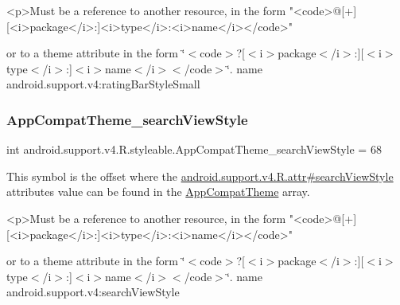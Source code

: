 \begin{DoxyVerb}      <p>Must be a reference to another resource, in the form "<code>@[+][<i>package</i>:]<i>type</i>:<i>name</i></code>"
\end{DoxyVerb}
 or to a theme attribute in the form \char`\"{}$<$code$>$?\mbox{[}$<$i$>$package$<$/i$>$\+:\mbox{]}\mbox{[}$<$i$>$type$<$/i$>$\+:\mbox{]}$<$i$>$name$<$/i$>$$<$/code$>$\char`\"{}.  name android.\+support.\+v4\+:rating\+Bar\+Style\+Small \mbox{\label{classandroid_1_1support_1_1v4_1_1R_1_1styleable_ad107185a80adbb1be528d21aa3a5e644}} 
\subsubsection{\texorpdfstring{App\+Compat\+Theme\+\_\+search\+View\+Style}{AppCompatTheme\_searchViewStyle}}
{\footnotesize\ttfamily int android.\+support.\+v4.\+R.\+styleable.\+App\+Compat\+Theme\+\_\+search\+View\+Style = 68\hspace{0.3cm}{\ttfamily [static]}}

This symbol is the offset where the \hyperlink{classandroid_1_1support_1_1v4_1_1R_1_1attr_a5814aa596bd1d0d9ca38992ec80a0507}{android.\+support.\+v4.\+R.\+attr\#search\+View\+Style} attribute\textquotesingle{}s value can be found in the \hyperlink{classandroid_1_1support_1_1v4_1_1R_1_1styleable_ac07ebbe62ed977f6dcaadc6397840ace}{App\+Compat\+Theme} array.

\begin{DoxyVerb}      <p>Must be a reference to another resource, in the form "<code>@[+][<i>package</i>:]<i>type</i>:<i>name</i></code>"
\end{DoxyVerb}
 or to a theme attribute in the form \char`\"{}$<$code$>$?\mbox{[}$<$i$>$package$<$/i$>$\+:\mbox{]}\mbox{[}$<$i$>$type$<$/i$>$\+:\mbox{]}$<$i$>$name$<$/i$>$$<$/code$>$\char`\"{}.  name android.\+support.\+v4\+:search\+View\+Style \mbox{\label{classandroid_1_1support_1_1v4_1_1R_1_1styleable_ac401ab56daa8fcd20c0beb0413d8813f}} 
